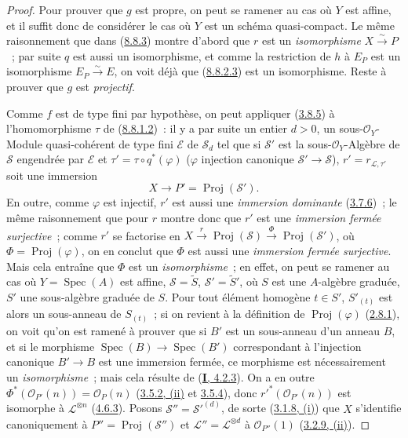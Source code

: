 \begin{proof}
Pour prouver que $g$ est propre, on peut se ramener au cas où $Y$ est affine,
et il suffit donc de considérer le cas où $Y$ est un schéma quasi-compact. Le
même raisonnement que dans (\hyperref[II.8.8.3-fr]{8.8.3}) montre d'abord que
$r$ est un \emph{isomorphisme} $X\xrightarrow{\sim}P$~; par suite $q$ est aussi
un isomorphisme, et comme la restriction de $h$ à $E_P$ est un isomorphisme
$E_P\xrightarrow{\sim}E$, on voit déjà que
(\hyperref[II.8.8.2.3-fr]{8.8.2.3}) est un isomorphisme. Reste à prouver que
$g$ est \emph{projectif}.

Comme $f$ est de type fini par hypothèse, on peut appliquer
(\hyperref[II.3.8.5-fr]{3.8.5}) à l'homomorphisme
$\tau$ de (\hyperref[II.8.8.1.2-fr]{8.8.1.2})~: il y a par suite un entier
$d>0$, un sous-$\mathcal{O}_Y$-Module quasi-cohérent de type fini
$\mathcal{E}$ de $\mathcal{S}_d$ tel que si $\mathcal{S}'$ est la
sous-$\mathcal{O}_Y$-Algèbre de $\mathcal{S}$ engendrée par $\mathcal{E}$ et
$\tau'=\tau\circ q^*(\varphi)$ ($\varphi$ injection canonique
$\mathcal{S}'\to\mathcal{S}$), $r'=r_{\mathcal{L},\tau'}$ soit une immersion
\[
  X\longrightarrow P'=\operatorname{Proj}(\mathcal{S}').
\]
En outre, comme $\varphi$ est injectif, $r'$ est aussi une \emph{immersion
dominante} (\hyperref[II.3.7.6-fr]{3.7.6})~; le même raisonnement que pour $r$
montre donc que $r'$ est une \emph{immersion fermée surjective}~; comme $r'$ se
factorise en
$X\xrightarrow{r}\operatorname{Proj}(\mathcal{S})
\xrightarrow{\Phi}\operatorname{Proj}(\mathcal{S}')$, où
$\Phi=\operatorname{Proj}(\varphi)$, on en conclut que $\Phi$ est aussi une
\emph{immersion fermée surjective}. Mais cela entraîne que $\Phi$ est un
\emph{isomorphisme}~; en effet, on peut se ramener au cas où
$Y=\operatorname{Spec}(A)$ est affine, $\mathcal{S}=\widetilde{S}$,
$\mathcal{S}'=\widetilde{S}'$, où $S$ est une $A$-algèbre graduée, $S'$ une
sous-algèbre graduée de $S$. Pour tout élément homogène $t\in S'$,
$S'_{(t)}$ est alors un sous-anneau de $S_{(t)}$~; si on revient à la
définition de $\operatorname{Proj}(\varphi)$
(\hyperref[II.2.8.1-fr]{2.8.1}), on voit qu'on est ramené à prouver que si
$B'$ est un sous-anneau d'un anneau $B$, et si le morphisme
$\operatorname{Spec}(B)\to\operatorname{Spec}(B')$ correspondant à l'injection
canonique $B'\to B$ est une immersion fermée, ce morphisme est nécessairement
un \emph{isomorphisme}~; mais cela résulte de
(\hyperref[I.4.2.3-fr]{\textbf{I}, 4.2.3}).
On a en outre
$\Phi^*(\mathcal{O}_{P'}(n))=\mathcal{O}_P(n)$
(\hyperref[II.3.5.2-fr]{3.5.2, (ii)} et
\hyperref[II.3.5.4-fr]{3.5.4}), donc
$r'^*(\mathcal{O}_{P'}(n))$ est isomorphe à $\mathcal{L}^{\otimes n}$
(\hyperref[II.4.6.3-fr]{4.6.3}). Posons
$\mathcal{S}''=\mathcal{S}'^{(d)}$, de sorte
(\hyperref[II.3.1.8-fr]{3.1.8, (i)}) que $X$ s'identifie canoniquement à
$P''=\operatorname{Proj}(\mathcal{S}'')$ et
$\mathcal{L}''=\mathcal{L}^{\otimes d}$ à $\mathcal{O}_{P''}(1)$
(\hyperref[II.3.2.9-fr]{3.2.9, (ii)}).


\end{proof}

